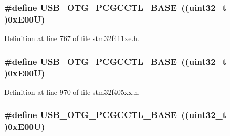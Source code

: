 \subsubsection[{\texorpdfstring{U\+S\+B\+\_\+\+O\+T\+G\+\_\+\+P\+C\+G\+C\+C\+T\+L\+\_\+\+B\+A\+SE}{USB_OTG_PCGCCTL_BASE}}]{\setlength{\rightskip}{0pt plus 5cm}\#define U\+S\+B\+\_\+\+O\+T\+G\+\_\+\+P\+C\+G\+C\+C\+T\+L\+\_\+\+B\+A\+SE~((uint32\+\_\+t )0x\+E00\+U)}\hypertarget{group___peripheral__registers__structures_gaa9766975aca084c257730879568bc7cf}{}\label{group___peripheral__registers__structures_gaa9766975aca084c257730879568bc7cf}


Definition at line 767 of file stm32f411xe.\+h.

\subsubsection[{\texorpdfstring{U\+S\+B\+\_\+\+O\+T\+G\+\_\+\+P\+C\+G\+C\+C\+T\+L\+\_\+\+B\+A\+SE}{USB_OTG_PCGCCTL_BASE}}]{\setlength{\rightskip}{0pt plus 5cm}\#define U\+S\+B\+\_\+\+O\+T\+G\+\_\+\+P\+C\+G\+C\+C\+T\+L\+\_\+\+B\+A\+SE~((uint32\+\_\+t )0x\+E00\+U)}\hypertarget{group___peripheral__registers__structures_gaa9766975aca084c257730879568bc7cf}{}\label{group___peripheral__registers__structures_gaa9766975aca084c257730879568bc7cf}


Definition at line 970 of file stm32f405xx.\+h.

\subsubsection[{\texorpdfstring{U\+S\+B\+\_\+\+O\+T\+G\+\_\+\+P\+C\+G\+C\+C\+T\+L\+\_\+\+B\+A\+SE}{USB_OTG_PCGCCTL_BASE}}]{\setlength{\rightskip}{0pt plus 5cm}\#define U\+S\+B\+\_\+\+O\+T\+G\+\_\+\+P\+C\+G\+C\+C\+T\+L\+\_\+\+B\+A\+SE~((uint32\+\_\+t )0x\+E00\+U)}\hypertarget{group___peripheral__registers__structures_gaa9766975aca084c257730879568bc7cf}{}\label{group___peripheral__registers__structures_gaa9766975aca084c257730879568bc7cf}


